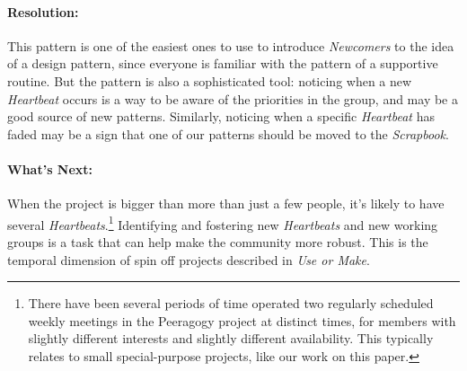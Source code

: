 \paragraph{Resolution:} This pattern is one of the easiest ones to use to introduce \emph{Newcomers} to the idea of a design pattern, since everyone is familiar with the pattern of a supportive routine.  But the pattern is also a sophisticated tool: noticing when a new \emph{Heartbeat} occurs is a way to be aware of the priorities in the group, and may be a good source of new patterns.  Similarly, noticing when a specific \emph{Heartbeat} has faded may be a sign that one of our patterns should be moved to the \emph{Scrapbook}.

\paragraph{What's Next:} When the project is bigger than more than just a few people, it's likely to have several \emph{Heartbeats}.\footnote{There have been several periods of time operated two regularly scheduled weekly meetings in the Peeragogy project at distinct times, for members with slightly different interests and slightly different availability.  This typically relates to small special-purpose projects, like our work on this paper.}  Identifying and fostering new \emph{Heartbeats} and new working groups is a task that can help make the community more robust.  This is the temporal dimension of spin off projects described in \emph{Use or Make}.

